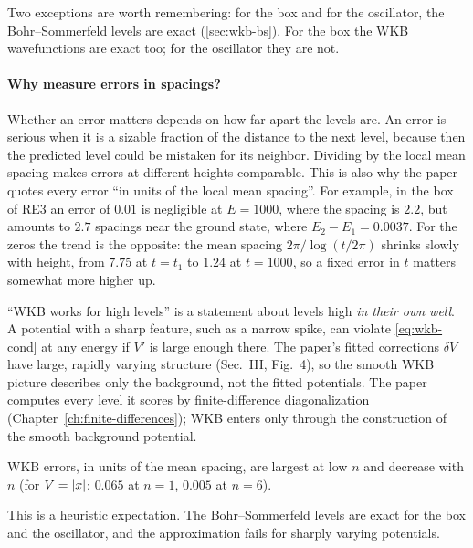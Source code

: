 Two exceptions are worth remembering: for the box and for the oscillator, the Bohr--Sommerfeld levels are exact (\cref{sec:wkb-bs}). For the box the WKB wavefunctions are exact too; for the oscillator they are not.

\paragraph{Why measure errors in spacings?} Whether an error matters depends on how far apart the levels are. An error is serious when it is a sizable fraction of the distance to the next level, because then the predicted level could be mistaken for its neighbor. Dividing by the local mean spacing makes errors at different heights comparable. This is also why the paper quotes every error ``in units of the local mean spacing''. For example, in the box of RE3 an error of $0.01$ is negligible at $E=1000$, where the spacing is $2.2$, but amounts to $2.7$ spacings near the ground state, where $E_2-E_1=0.0037$. For the zeros the trend is the opposite: the mean spacing $2\pi/\log(t/2\pi)$ shrinks slowly with height, from $7.75$ at $t=t_1$ to $1.24$ at $t=1000$, so a fixed error in $t$ matters somewhat more higher up.

\begin{pitfall}
``WKB works for high levels'' is a statement about levels high \emph{in their own well}. A potential with a sharp feature, such as a narrow spike, can violate \cref{eq:wkb-cond} at any energy if $V'$ is large enough there. The paper's fitted corrections $\delta V$ have large, rapidly varying structure (Sec.~III, Fig.~4), so the smooth WKB picture describes only the background, not the fitted potentials. The paper computes every level it scores by finite-difference diagonalization (Chapter~\ref{ch:finite-differences}); WKB enters only through the construction of the smooth background potential.
\end{pitfall}

\begin{keyideas}
\item WKB errors, in units of the mean spacing, are largest at low $n$ and decrease with $n$ (for $V=\left\lvert x\right\rvert$: $0.065$ at $n=1$, $0.005$ at $n=6$).
\item This is a heuristic expectation. The Bohr--Sommerfeld levels are exact for the box and the oscillator, and the approximation fails for sharply varying potentials.
\end{keyideas}

